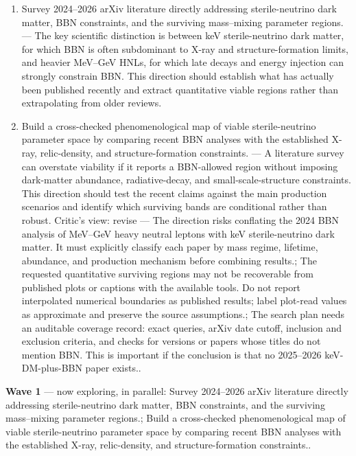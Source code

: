 \documentclass[11pt,a4paper]{article}
\begin{document}
\begin{enumerate}
  \item Survey 2024--2026 arXiv literature directly addressing sterile-neutrino dark matter, BBN constraints, and the surviving mass--mixing parameter regions. --- The key scientific distinction is between keV sterile-neutrino dark matter, for which BBN is often subdominant to X-ray and structure-formation limits, and heavier MeV--GeV HNLs, for which late decays and energy injection can strongly constrain BBN. This direction should establish what has actually been published recently and extract quantitative viable regions rather than extrapolating from older reviews.
  \item Build a cross-checked phenomenological map of viable sterile-neutrino parameter space by comparing recent BBN analyses with the established X-ray, relic-density, and structure-formation constraints. --- A literature survey can overstate viability if it reports a BBN-allowed region without imposing dark-matter abundance, radiative-decay, and small-scale-structure constraints. This direction should test the recent claims against the main production scenarios and identify which surviving bands are conditional rather than robust.
Critic's view: revise --- The direction risks conflating the 2024 BBN analysis of MeV--GeV heavy neutral leptons with keV sterile-neutrino dark matter. It must explicitly classify each paper by mass regime, lifetime, abundance, and production mechanism before combining results.; The requested quantitative surviving regions may not be recoverable from published plots or captions with the available tools. Do not report interpolated numerical boundaries as published results; label plot-read values as approximate and preserve the source assumptions.; The search plan needs an auditable coverage record: exact queries, arXiv date cutoff, inclusion and exclusion criteria, and checks for versions or papers whose titles do not mention BBN. This is important if the conclusion is that no 2025--2026 keV-DM-plus-BBN paper exists..

\end{enumerate}
\textbf{Wave 1} --- now exploring, in parallel: Survey 2024--2026 arXiv literature directly addressing sterile-neutrino dark matter, BBN constraints, and the surviving mass--mixing parameter regions.; Build a cross-checked phenomenological map of viable sterile-neutrino parameter space by comparing recent BBN analyses with the established X-ray, relic-density, and structure-formation constraints..
\end{document}
